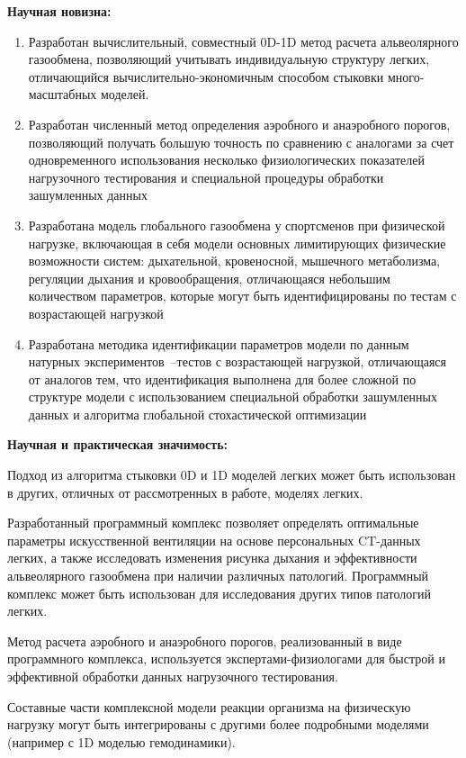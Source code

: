 \textbf{Научная новизна:}
\begin{enumerate}
 \item 
Разработан вычислительный, совместный 0D-1D метод расчета альвеолярного газообмена, позволяющий учитывать индивидуальную структуру легких, отличающийся вычислительно-экономичным способом стыковки много-масштабных моделей.
 \item 
 Разработан численный метод определения аэробного и анаэробного порогов, позволяющий получать большую точность по сравнению с аналогами за счет одновременного использования несколько физиологических показателей нагрузочного тестирования и специальной процедуры обработки зашумленных данных
 \item
 Разработана модель глобального газообмена у спортсменов при физической нагрузке, включающая в себя модели основных лимитирующих физические возможности систем: дыхательной, кровеносной, мышечного метаболизма, регуляции дыхания и кровообращения, отличающаяся небольшим количеством параметров, которые могут быть идентифицированы по тестам с возрастающей нагрузкой
 \item
 Разработана методика идентификации параметров модели по данным натурных экспериментов~--тестов с возрастающей нагрузкой, отличающаяся от аналогов тем, что идентификация выполнена для более сложной по структуре модели с использованием специальной обработки зашумленных данных и алгоритма глобальной стохастической оптимизации  
  
\end{enumerate}

\textbf{Научная и практическая значимость:} 

Подход из алгоритма стыковки 0D и 1D моделей легких может быть использован в  других, отличных от рассмотренных в работе, моделях легких.

Разработанный программный комплекс позволяет определять оптимальные параметры искусственной вентиляции на основе персональных CT-данных легких, а также исследовать изменения рисунка дыхания и эффективности альвеолярного газообмена при наличии различных патологий. Программный комплекс может быть использован для исследования других типов патологий легких.

Метод расчета аэробного и анаэробного порогов, реализованный в виде программного комплекса, используется экспертами-физиологами для быстрой и эффективной обработки данных нагрузочного тестирования.

Составные части комплексной модели реакции организма на физическую нагрузку могут быть интегрированы с другими более подробными моделями (например с 1D моделью гемодинамики).

